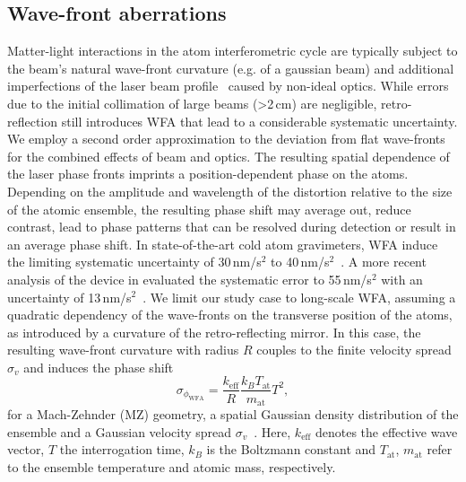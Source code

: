 \subsection{Wave-front aberrations}\label{sec:WFA}
Matter-light interactions in the atom interferometric cycle are typically subject to the beam's natural wave-front curvature (e.g. of a gaussian beam) and additional imperfections of the laser beam profile~\cite{Schkolnik2015,LouchetChauvet2011} caused by non-ideal optics. While errors due to the initial collimation of large beams (>2\,cm) are negligible, retro-reflection still introduces WFA that lead to a considerable systematic uncertainty. We employ a second order approximation to the deviation from flat wave-fronts for the combined effects of beam and optics.
The resulting spatial dependence of the laser phase fronts imprints a position-dependent phase on the atoms.
Depending on the amplitude and wavelength of the distortion relative to the size of the atomic ensemble, the resulting phase shift may average out, reduce contrast, lead to phase patterns that can be resolved during detection or result in an average phase shift. In state-of-the-art cold atom gravimeters, WFA induce the limiting systematic uncertainty of 30\,nm/s$^2$ to 40\,nm/s$^2$~\cite{Freier2016,Gillot2016}. A more recent analysis of the device in \cite{Gillot2016} evaluated the systematic error to 55\,nm/s$^2$ with an uncertainty of 13\,nm/s$^2$~\cite{Karcher2018}.
We limit our study case to long-scale WFA, assuming a quadratic dependency of the wave-fronts on the transverse position of the atoms, as introduced by a curvature of the retro-reflecting mirror. In this case, the resulting wave-front curvature with radius $R$ couples to the finite velocity spread $\sigma_v$ and induces the phase shift
\begin{equation}
    \label{eq:WFA}
    \sigma_{\phi_\text{WFA}}=\frac{k_\text{eff}}{R} \frac{k_B T_\text{at}}{m_\text{at}}T^2,
\end{equation}
for a Mach-Zehnder (MZ) geometry, a spatial Gaussian density distribution of the ensemble and a Gaussian velocity spread $\sigma_v$~\cite{LouchetChauvet2011}. Here, $k_\text{eff}$ denotes the effective wave vector, $T$ the interrogation time, $k_B$ is the Boltzmann constant and $T_\text{at}$, $m_\text{at}$ refer to the ensemble temperature and atomic mass, respectively.
%
